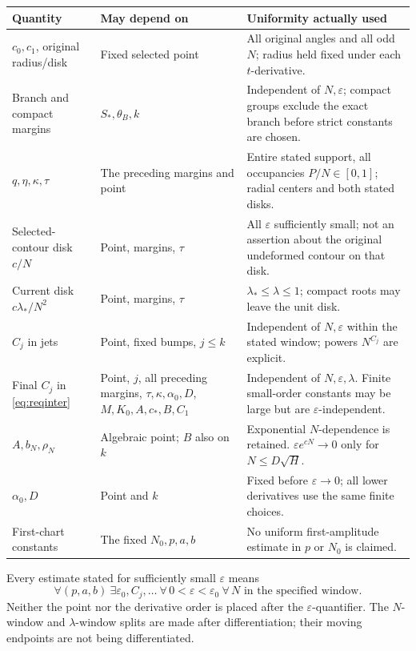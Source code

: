 \documentclass[11pt]{article}
\numberwithin{equation}{section}
\theoremstyle{definition}
\newcommand{\eps}{\varepsilon}
\begin{document}
\begin{longtable}{>{\raggedright\arraybackslash}p{}>{\raggedright\arraybackslash}p{}>{\raggedright\arraybackslash}p{}}
\toprule
Quantity & May depend on & Uniformity actually used\\
\midrule
\endhead
\(c_0,c_1\), original radius/disk &
Fixed selected point & All original angles and all odd \(N\);
radius held fixed under each \(t\)-derivative.\\
Branch and compact margins &
\(S_*,\theta_B,k\) & Independent of \(N,\eps\); compact groups
exclude the exact branch before strict constants are chosen.\\
\(q,\eta,\kappa,\tau\) &
The preceding margins and point & Entire stated support, all
occupancies \(P/N\in[0,1]\); radial centers and both stated disks.\\
Selected-contour disk \(c/N\) &
Point, margins, \(\tau\) & All \(\eps\) sufficiently small;
not an assertion about the original undeformed contour on that disk.\\
Current disk \(c\lambda_*/N^2\) &
Point, margins, \(\tau\) & \(\lambda_*\le\lambda\le1\);
compact roots may leave the unit disk.\\
\(C_j\) in jets &
Point, fixed bumps, \(j\le k\) & Independent of \(N,\eps\) within
the stated window; powers \(N^{C_j}\) are explicit.\\
Final \(C_j\) in \eqref{eq:reqinter} &
Point, \(j\), all preceding margins, \(\tau,\kappa,\alpha_0,D\),
\(M,K_0,A,c_*,B,C_1\) & Independent of \(N,\eps,\lambda\).
Finite small-order constants may be large but are
\(\eps\)-independent.\\
\(A,b_N,\rho_N\) &
Algebraic point; \(B\) also on \(k\) & Exponential \(N\)-dependence
is retained. \(\eps e^{cN}\to0\) only for \(N\le D\sqrt H\).\\
\(\alpha_0,D\) &
Point and \(k\) & Fixed before \(\eps\to0\); all lower derivatives
use the same finite choices.\\
First-chart constants &
The fixed \(N_0,p,a,b\) & No uniform first-amplitude estimate
in \(p\) or \(N_0\) is claimed.\\
\bottomrule
\end{longtable}

Every estimate stated for sufficiently small \(\eps\) means
\[
 \forall(p,a,b)\ \exists\eps_0,C_j,\ldots\
 \forall\,0<\eps<\eps_0\
 \forall\,N\text{ in the specified window}.
\]
Neither the point nor the derivative order is placed after the
\(\eps\)-quantifier. The \(N\)-window and \(\lambda\)-window splits
are made after differentiation; their moving endpoints are not
being differentiated.
\end{document}
